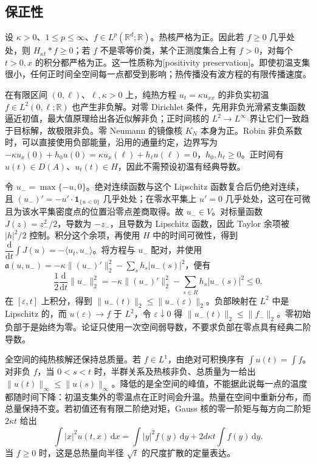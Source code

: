 \subsection{保正性}
\label{b2:subsec:120304}

设 \(\kappa>0\)、\(1\le p\le\infty\)、\(f\in L^p(\mathbb R^d;\mathbb R)\)。热核严格为正。因此若 \(f\geq0\) 几乎处处，则 \(H_{\kappa t}*f\geq0\)；若 \(f\) 不是零等价类，某个正测度集合上有 \(f>0\)，对每个 \(t>0,x\) 的积分都严格为正。这一性质称为[positivity preservation]。即使初温支集很小，任何正时间全空间每一点都受到影响；热传播没有波方程的有限传播速度。

\ProseParagraphBreak

在有限区间 \((0,\ell)\)、\(\ell,\kappa>0\) 上，纯热方程 \(u_t=\kappa u_{xx}\) 的非负实初温 \(f\in L^2(0,\ell;\mathbb R)\) 也产生非负解。对零 Dirichlet 条件，先用非负光滑紧支集函数逼近初值，最大值原理给出各近似解非负；正时间核的 \(L^2\to L^\infty\) 界让它们一致趋于目标解，故极限非负。零 Neumann 的镜像核 \(K_N\) 本身为正。Robin 非负系数时，可以直接使用负部能量，沿用的通量约定，边界写为 \(-\kappa u_x(0)+h_0u(0)=\kappa u_x(\ell)+h_\ell u(\ell)=0\)，\(h_0,h_\ell\geq0\)。正时间有 \(u(t)\in D(A)\)、\(u_t(t)\in H\)，因此不需预设初温有经典导数。

\ProseParagraphBreak

令 \(u_-=\max\{-u,0\}\)。绝对连续函数与这个 Lipschitz 函数复合后仍绝对连续，且 \((u_-)'=-u'\cdot\mathbf1_{\{u<0\}}\) 几乎处处；在零水平集上 \(u'=0\) 几乎处处，这可在可微且为该水平集密度点的位置沿零点差商取得。故 \(u_-\in V\)。对标量函数 \(J(z)=z_-^2/2\)，导数为 \(-z_-\)，且导数为 Lipschitz 函数，因此 Taylor 余项被 \(|h|^2/2\) 控制。积分这个余项，再使用 \(H\) 中的时间可微性，得到 \(\dfrac{\mathrm{d}}{\mathrm{d}t}\int J(u)=-\langle u_t,u_-\rangle\)。将方程与 \(u_-\) 配对，并使用 \(\mathfrak a(u,u_-)=-\kappa\|(u_-)'\|_2^2-\sum_s h_s|u_-(s)|^2\)，便有
\[
 \dfrac12\dfrac{\mathrm{d}}{\mathrm{d}t}\|u_-\|_2^2
 =-\kappa\|(u_-)'\|_2^2
 -\sum_{s\in R}h_s|u_-(s)|^2\leq0.
\]
在 \([\varepsilon,t]\) 上积分，得到 \(\|u_-(t)\|_2\leq\|u_-(\varepsilon)\|_2\)。负部映射在 \(L^2\) 中是 Lipschitz 的，而 \(u(\varepsilon)\to f\) 于 \(L^2\)，令 \(\varepsilon\downarrow0\) 得 \(\|u_-(t)\|_2\leq\|f_-\|_2\)。零初始负部于是始终为零。论证只使用一次空间弱导数，不要求负部在零点具有经典二阶导数。

\ProseParagraphBreak

全空间的纯热核解还保持总质量。若 \(f\in L^1\)，由绝对可积换序有 \(\int u(t)=\int f\)。对非负 \(f\)，当 \(0<s<t\) 时，半群关系及热核非负、总质量为一给出 \(\|u(t)\|_\infty\leq\|u(s)\|_\infty\)。降低的是全空间的峰值，不能据此说每一点的温度都随时间下降：初温支集外的零温点在正时间会升温。热量在空间中重新分布，而总量保持不变。若初值还有有限二阶绝对矩，Gauss 核的零一阶矩与每方向二阶矩 \(2\kappa t\) 给出
\[
 \int|x|^2u(t,x)\,\mathrm{d}x
 =\int|y|^2f(y)\,\mathrm{d}y+2d\kappa t\int f(y)\,\mathrm{d}y.
\]
当 \(f\geq0\) 时，这是总热量向半径 \(\sqrt t\) 的尺度扩散的定量表达。
